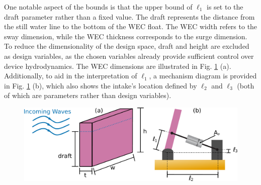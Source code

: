\documentclass[twocolumn,10pt]{asme2e}
\begin{document}
One notable aspect of the bounds is that the upper bound of $\ell_1$ is set to the draft parameter rather than a fixed value. The draft represents the distance from the still water line to the bottom of the WEC float. The WEC width refers to the sway dimension, while the WEC thickness corresponds to the surge dimension. To reduce the dimensionality of the design space, draft and height are excluded as design variables, as the chosen variables already provide sufficient control over device hydrodynamics. The WEC dimensions are illustrated in Fig. \ref{fig:dvs} (a). Additionally, to aid in the interpretation of $\ell_1$, a mechanism diagram is provided in Fig. \ref{fig:dvs} (b), which also shows the intake's location defined by $\ell_2$ and $\ell_3$ (both of which are parameters rather than design variables).



\begin{figure}
    \centering
    \includegraphics[width=\linewidth]{../figs/dvs.pdf}
    \label{fig:dvs}
\end{figure}

\end{document}
